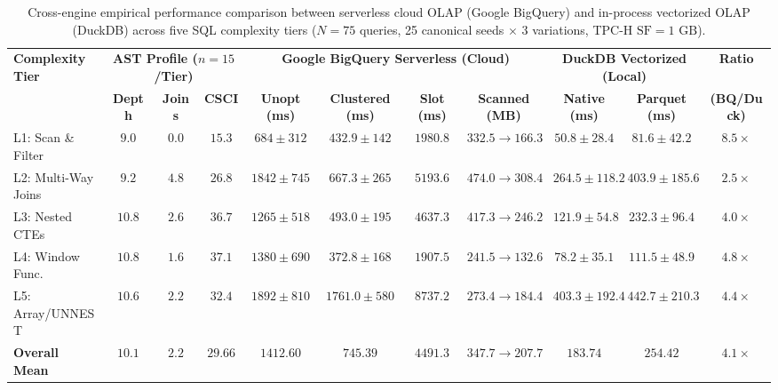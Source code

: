 \documentclass[10pt,a4paper]{article}
\newenvironment{fitasttable}{%
  \begin{lrbox}{\asttblbox}%
}{%
  \end{lrbox}%
  \sbox{\asttblboxB}{%
    \ifdim\wd\asttblbox>0.96\textwidth
      \resizebox{0.96\textwidth}{!}{\usebox{\asttblbox}}%
    \else
      \usebox{\asttblbox}%
    \fi
  }%
  \ifdim\ht\asttblboxB>0.78\textheight
    \resizebox{!}{0.78\textheight}{\usebox{\asttblboxB}}%
  \else
    \usebox{\asttblboxB}%
  \fi
}
\begin{document}
\begin{table}[!htbp]
\centering
\caption{Cross-engine empirical performance comparison between serverless cloud OLAP (Google BigQuery) and in-process vectorized OLAP (DuckDB) across five SQL complexity tiers ($N=75$ queries, 25 canonical seeds $\times$ 3 variations, TPC-H $\text{SF}=1\text{ GB}$).}\label{tab:jbd_bq_duck_t2}
\label{tab:cross_engine_main}
\scriptsize
\setlength{\tabcolsep}{3.2pt}
\renewcommand{\arraystretch}{1.12}
\begin{fitasttable}
\begin{tabular}{@{}lcccccccccc@{}}
\toprule
\multirow{2}{*}{\textbf{Complexity Tier}} & \multicolumn{3}{c}{\textbf{AST Profile ($n=15$/Tier)}} & \multicolumn{4}{c}{\textbf{Google BigQuery Serverless (Cloud)}} & \multicolumn{2}{c}{\textbf{DuckDB Vectorized (Local)}} & \textbf{Ratio} \\
\cmidrule(lr){2-4} \cmidrule(lr){5-8} \cmidrule(lr){9-10} \cmidrule(lr){11-11}
 & \textbf{Depth} & \textbf{Joins} & \textbf{CSCI} & \textbf{Unopt (ms)} & \textbf{Clustered (ms)} & \textbf{Slot (ms)} & \textbf{Scanned (MB)} & \textbf{Native (ms)} & \textbf{Parquet (ms)} & \textbf{(BQ/Duck)} \\
\midrule
L1: Scan \& Filter & $9.0$ & $0.0$ & $15.3$ & $684 \pm 312$ & $432.9 \pm 142$ & $1980.8$ & $332.5 \rightarrow 166.3$ & $\mathbf{50.8 \pm 28.4}$ & $81.6 \pm 42.2$& $8.5\times$ \\
L2: Multi-Way Joins & $9.2$ & $4.8$ & $26.8$ & $1842 \pm 745$ & $667.3 \pm 265$ & $5193.6$ & $474.0 \rightarrow 308.4$ & $\mathbf{264.5 \pm 118.2}$ & $403.9 \pm 185.6$& $2.5\times$ \\
L3: Nested CTEs & $10.8$ & $2.6$ & $36.7$ & $1265 \pm 518$ & $493.0 \pm 195$ & $4637.3$ & $417.3 \rightarrow 246.2$ & $\mathbf{121.9 \pm 54.8}$ & $232.3 \pm 96.4$& $4.0\times$ \\
L4: Window Func. & $10.8$ & $1.6$ & $37.1$ & $1380 \pm 690$ & $372.8 \pm 168$ & $1907.5$ & $241.5 \rightarrow 132.6$ & $\mathbf{78.2 \pm 35.1}$ & $111.5 \pm 48.9$& $4.8\times$ \\
L5: Array/UNNEST & $10.6$ & $2.2$ & $32.4$ & $1892 \pm 810$ & $1761.0 \pm 580$ & $8737.2$ & $273.4 \rightarrow 184.4$ & $\mathbf{403.3 \pm 192.4}$ & $442.7 \pm 210.3$& $4.4\times$ \\
\midrule
\textbf{Overall Mean} & $\mathbf{10.1}$ & $\mathbf{2.2}$ & $\mathbf{29.66}$ & $\mathbf{1412.60}$ & $\mathbf{745.39}$ & $\mathbf{4491.3}$ & $\mathbf{347.7 \rightarrow 207.7}$ & $\mathbf{183.74}$ & $\mathbf{254.42}$ & $\mathbf{4.1\times}$ \\

\end{tabular}
\end{fitasttable}
\end{table}
\end{document}
